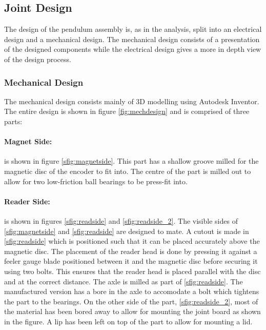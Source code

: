 \subsection{Joint Design} %
\label{sub:joint_design}
The design of the pendulum assembly is, as in the analysis, split into an electrical design and a mechanical design.
The mechanical design consists of a presentation of the designed components while the electrical design gives a more in depth view of the design process.

\subsubsection{Mechanical Design} %
\label{ssub:mechanical_design}
The mechanical design consists mainly of 3D modelling using Autodesk Inventor.
The entire design is shown in figure \ref{fig:mechdesign} and is comprised of three parts:
\paragraph{Magnet Side:} %
\label{par:magnet_side}
is shown in figure \ref{sfig:magnetside}. 
This part has a shallow groove milled for the magnetic disc of the encoder to fit into.
The centre of the part is milled out to allow for two low-friction ball bearings to be press-fit into.
\paragraph{Reader Side:} %
\label{par:reader_side}
is shown in figures \ref{sfig:readside} and \ref{sfig:readside_2}.
The visible sides of \ref{sfig:magnetside} and \ref{sfig:readside} are designed to mate.
A cutout is made in \ref{sfig:readside} which is positioned such that it can be placed accurately above the magnetic disc.
The placement of the reader head is done by pressing it against a feeler gauge blade positioned between it and the magnetic disc before securing it using two bolts.
This ensures that the reader head is placed parallel with the disc and at the correct distance.
The axle is milled as part of \ref{sfig:readside}.
The manufactured version has a bore in the axle to accomodate a bolt which tightens the part to the bearings.
On the other side of the part, \ref{sfig:readside_2}, most of the material has been bored away to allow for mounting the joint board as shown in the figure.
A lip has been left on top of the part to allow for mounting a lid.


